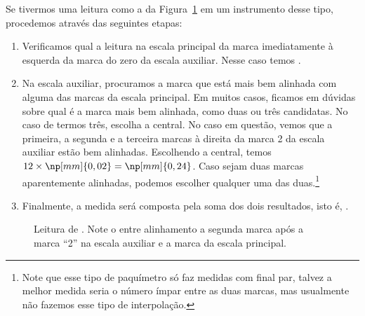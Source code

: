 Se tivermos uma leitura como a da Figura~\ref{Fig:PaquimetroLeitura} em um instrumento desse tipo, procedemos através das seguintes etapas:
\begin{enumerate}
	\item Verificamos qual a leitura na escala principal da marca imediatamente à esquerda da marca do zero da escala auxiliar. Nesse caso temos .
	\item Na escala auxiliar, procuramos a marca que está mais bem alinhada com alguma das marcas da escala principal. Em muitos casos, ficamos em dúvidas sobre qual é a marca mais bem alinhada, como duas ou três candidatas. No caso de termos três, escolha a central. No caso em questão, vemos que a primeira, a segunda e a terceira marcas à direita da marca 2 da escala auxiliar estão bem alinhadas. Escolhendo a central, temos $12 \times \np[mm]{0,02} = \np[mm]{0,24}$. Caso sejam duas marcas aparentemente alinhadas, podemos escolher qualquer uma das duas.\footnote{Note que esse tipo de paquímetro só faz medidas com final par, talvez a melhor medida seria o número ímpar entre as duas marcas, mas usualmente não fazemos esse tipo de interpolação.}
	\item Finalmente, a medida será composta pela soma dos dois resultados, isto é, .
\end{enumerate}

\begin{figure}\forceversofloat
\centering
{}
\caption{Leitura de . Note o entre alinhamento a segunda marca após a marca ``2'' na escala auxiliar e a marca da escala principal.\label{Fig:PaquimetroLeitura}}
\end{figure}

